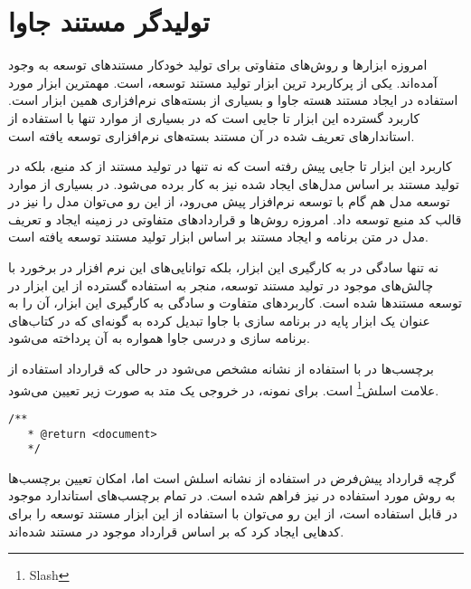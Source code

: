 %
% 
% 
% 
%
 
\section{تولیدگر مستند جاوا}
امروزه ابزارها و روش‌های متفاوتی برای تولید خودکار مستندهای توسعه به وجود آمده‌اند. یکی از پرکاربرد ترین ابزار تولید مستند توسعه،  است\cite{javadocsun}. مهمترین ابزار مورد استفاده در ایجاد مستند هسته جاوا و بسیاری از بسته‌های 
نرم‌افزاری همین ابزار است. کاربرد گسترده این ابزار تا جایی است که در بسیاری از موارد تنها با استفاده از استاندارهای تعریف شده
در آن مستند بسته‌های نرم‌افزاری توسعه یافته است.

کاربرد این ابزار تا جایی پیش رفته است که نه تنها در تولید مستند از کد منبع، بلکه در تولید مستند بر اساس مدل‌های ایجاد شده
نیز به کار برده می‌شود. در بسیاری از موارد توسعه مدل هم گام با توسعه نرم‌افزار پیش می‌رود، از این رو می‌توان مدل را نیز در 
قالب کد منبع توسعه داد. امروزه روش‌ها و قراردادهای متفاوتی در زمینه ایجاد و تعریف مدل در متن برنامه و ایجاد مستند بر
اساس ابزار تولید مستند  توسعه یافته است\cite{Kramer:1999:ADS:318372.318577}.

نه تنها سادگی در به کارگیری این ابزار، بلکه توانایی‌های این نرم افزار در برخورد با چالش‌های موجود در تولید مستند توسعه، منجر به استفاده گسترده از این ابزار در توسعه مستند‌ها شده است\cite{Leslie:2002:UJX:584955.584971}. کاربردهای متفاوت و
سادگی به کارگیری این ابزار، آن را به عنوان یک ابزار پایه در برنامه سازی با جاوا تبدیل کرده به گونه‌ای که در کتاب‌های برنامه سازی
و درسی جاوا همواره به آن پرداخته می‌شود\cite{Schildt:2000:JCR:557816}.

برچسب‌ها در  با استفاده از نشانه  مشخص می‌شود در حالی که قرارداد  
استفاده از علامت اسلش\footnote{Slash} است. برای نمونه، در  خروجی یک متد به صورت زیر تعیین
می‌شود.
\begin{latin}
\lstset{language=C++}  
\begin{lstlisting}[frame=single]
  /**
   * @return <document>
   */
\end{lstlisting}
\end{latin}
گرچه قرارداد پیش‌فرض در  استفاده از نشانه اسلش است اما،  امکان تعیین برچسب‌ها به روش
مورد استفاده در  نیز فراهم شده است. در  تمام برچسب‌های استاندارد
موجود در  قابل استفاده است، از این رو می‌توان با استفاده از این ابزار مستند توسعه را برای کدهایی ایجاد
کرد که بر اساس قرارداد موجود در  مستند شده‌اند.

